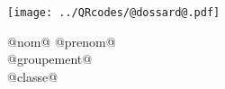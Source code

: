 \Huge

\begin{block} %
{}\hfill {}



\vspace{1cm}


\begin{minipage}{0.3\linewidth}
\texttt{[image: ../QRcodes/@dossard@.pdf]}
\end{minipage}
{}\hfill {}
\begin{minipage}{0.33\linewidth}
{}\hfill {}
{}\hfill {}


\begin{center}
	@nom@ @prenom@\\
	@groupement@	\\
	@classe@
\end{center}

	


\end{minipage}
\end{block}
